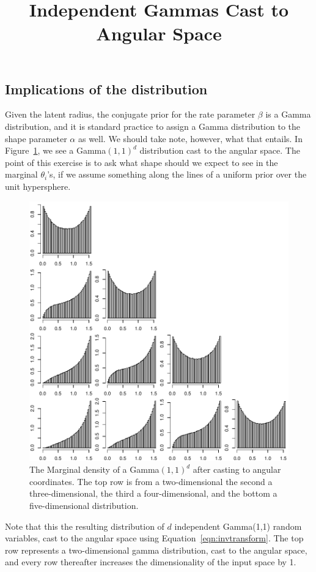 \subsection{Implications of the distribution}
Given the latent radius, the conjugate prior for the rate parameter
  $\beta$ is a Gamma distribution, and it is standard practice to assign
  a Gamma distribution to the shape parameter $\alpha$ as well.  We should
  take note, however, what that entails.  In Figure~\ref{fig:prior_implication},
  we see a Gamma$(1,1)^d$ distribution cast to the angular space.  The point of
  this exercise is to ask what shape should we expect to see in the marginal
  $\theta_i$'s, if we assume something along the lines of a uniform prior over
  the unit hypersphere.

\begin{figure}[ht]
  \centering
  \label{fig:prior_implication}
  \title{Independent Gammas Cast to Angular Space}
  \caption{The Marginal density of a Gamma$(1,1)^d$ after casting to angular coordinates.
            The top row is from a two-dimensional the second a three-dimensional,
            the third a four-dimensional, and the bottom a five-dimensional distribution.}
  \includegraphics{./images/implication_of_gamma_prior}
\end{figure}

Note that this the resulting distribution of $d$ independent Gamma(1,1) random
  variables, cast to the angular space using Equation~\ref{eqn:invtransform}.  The
  top row represents a two-dimensional gamma distribution, cast to the angular space,
  and every row thereafter increases the dimensionality of the input space by 1.

